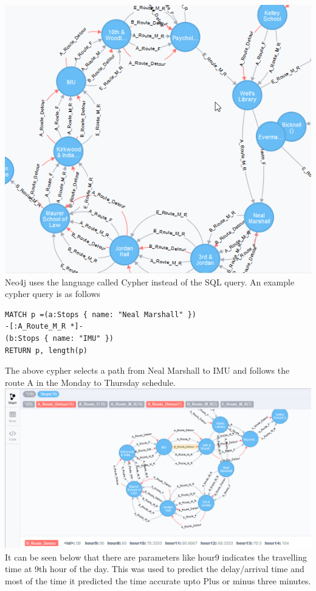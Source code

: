 \documentclass[12pt]{article}
\begin{document}
\includegraphics[scale=1]{resources/neo4j2}\\[1cm] 
Neo4j uses the language called Cypher instead of the SQL query. An example cypher query is as follows\\
\begin{verbatim}
MATCH p =(a:Stops { name: "Neal Marshall" })
-[:A_Route_M_R *]-
(b:Stops { name: "IMU" })
RETURN p, length(p)
\end{verbatim}
The above cypher selects a path from Neal Marshall to IMU and follows the route A in the Monday to Thursday schedule.\\
\includegraphics[scale=0.55]{resources/neo4j3}\\[1cm] 
It can be seen below that there are parameters like hour9 indicates the travelling time at 9th hour of the day. This was used to predict the delay/arrival time and most of the time it predicted the time accurate upto Plus or minus three minutes.\\ \\
\end{document}

